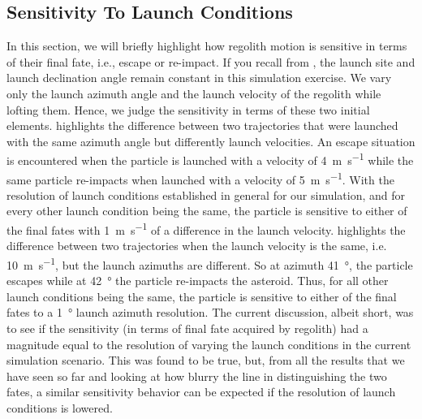 \subsection{Sensitivity To Launch Conditions}
\label{subsec:sensitivity_noSP}
In this section, we will briefly highlight how regolith motion is sensitive in terms of their final fate, i.e., escape or re-impact. If you recall from , the launch site and launch declination angle remain constant in this simulation exercise. We vary only the launch azimuth angle and the launch velocity of the regolith while lofting them. Hence, we judge the sensitivity in terms of these two initial elements.
%
\newline\newline
%
 highlights the difference between two trajectories that were launched with the same azimuth angle but differently launch velocities. An escape situation is encountered when the particle is launched with a velocity of \SI{4}{\metre\per\second} while the same particle re-impacts when launched with a velocity of \SI{5}{\metre\per\second}. With the resolution of launch conditions established in general for our simulation, and for every other launch condition being the same, the particle is sensitive to either of the final fates with \SI{1}{\metre\per\second} of a difference in the launch velocity.
%
\newline\newline
%
 highlights the difference between two trajectories when the launch velocity is the same, i.e. \SI{10}{\metre\per\second}, but the launch azimuths are different. So at azimuth \SI{41}{\degree}, the particle escapes while at \SI{42}{\degree} the particle re-impacts the asteroid. Thus, for all other launch conditions being the same, the particle is sensitive to either of the final fates to a \SI{1}{\degree} launch azimuth resolution.
%
\newline\newline
%
The current discussion, albeit short, was to see if the sensitivity (in terms of final fate acquired by regolith) had a magnitude equal to the resolution of varying the launch conditions in the current simulation scenario. This was found to be true, but, from all the results that we have seen so far and looking at how blurry the line in distinguishing the two fates, a similar sensitivity behavior can be expected if the resolution of launch conditions is lowered.


